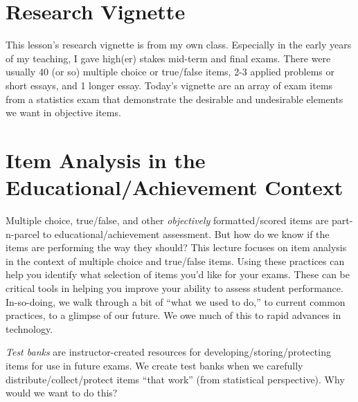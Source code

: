 \documentclass[
  english,
]{book}
\begin{document}
\hypertarget{research-vignette-2}{%
\section{Research Vignette}\label{research-vignette-2}}

This lesson's research vignette is from my own class. Especially in the early years of my teaching, I gave high(er) stakes mid-term and final exams. There were usually 40 (or so) multiple choice or true/false items, 2-3 applied problems or short essays, and 1 longer essay. Today's vignette are an array of exam items from a statistics exam that demonstrate the desirable and undesirable elements we want in objective items.

\hypertarget{item-analysis-in-the-educationalachievement-context}{%
\section{Item Analysis in the Educational/Achievement Context}\label{item-analysis-in-the-educationalachievement-context}}

Multiple choice, true/false, and other \emph{objectively} formatted/scored items are part-n-parcel to educational/achievement assessment. But how do we know if the items are performing the way they should? This lecture focuses on item analysis in the context of multiple choice and true/false items. Using these practices can help you identify what selection of items you'd like for your exams. These can be critical tools in helping you improve your ability to assess student performance.\\
In-so-doing, we walk through a bit of ``what we used to do,'' to current common practices, to a glimpse of our future. We owe much of this to rapid advances in technology.

\emph{Test banks} are instructor-created resources for developing/storing/protecting items for use in future exams. We create test banks when we carefully distribute/collect/protect items ``that work'' (from statistical perspective). Why would we want to do this?
\end{document}
